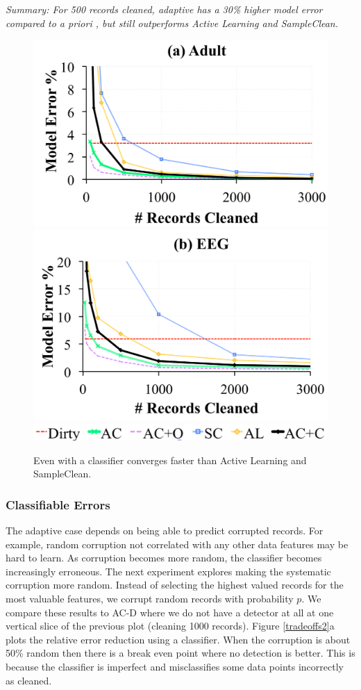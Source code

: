\vspace{0.25em}

\noindent \emph{Summary: For 500 records cleaned, adaptive \sys has a 30\% higher model error compared to a priori \sys, but still outperforms Active Learning and SampleClean.}

\begin{figure}[ht!]
\centering
 \includegraphics[width=0.49\columnwidth]{exp/exp11a.pdf}
 \includegraphics[width=0.49\columnwidth]{exp/exp11b.pdf}
 \includegraphics[width=0.49\columnwidth]{exp/legend-11.png}\vspace{-0.5em}
 \caption{Even with a classifier \sys converges faster than Active Learning and SampleClean. \label{pred-perf}}\vspace{-1.0em}
\end{figure}


\subsubsection{Classifiable Errors}
The adaptive case depends on being able to predict corrupted records.
For example, random corruption not correlated with any other data features may be hard to learn.
As corruption becomes more random, the classifier becomes increasingly erroneous.
The next experiment explores making the systematic corruption more random.
Instead of selecting the highest valued records for the most valuable features, we corrupt random records with probability $p$. 
We compare these results to AC-D where we do not have a detector at all at one vertical slice of the previous plot (cleaning 1000 records).
Figure \ref{tradeoffs2}a plots the relative error reduction using a classifier.
When the corruption is about 50\% random then there is a break even point where no detection is better.
This is because the classifier is imperfect and misclassifies some data points incorrectly as cleaned.

